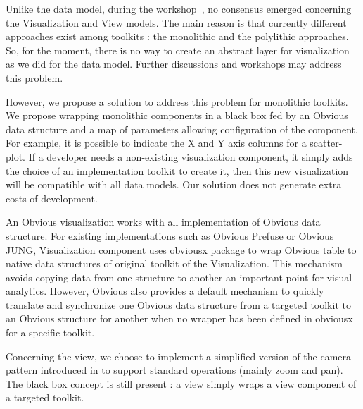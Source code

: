 Unlike the data model, during the workshop~\cite{vismaster2008}, no consensus emerged concerning the Visualization and View models. The main reason is that currently different approaches exist among toolkits : the monolithic and the polylithic approaches. So, for the moment, there is no way to create an abstract layer for visualization as we did for the data model. Further discussions and workshops may address this problem.

However, we propose a solution to address this problem for monolithic toolkits. We propose wrapping monolithic components in a black box fed by an Obvious data structure and a map of parameters allowing configuration of the component. For example, it is possible to indicate the X and Y axis columns for a scatter-plot. If a developer needs a non-existing visualization component, it simply adds the choice of an implementation toolkit to create it, then this new visualization will be compatible with all data models. Our solution does not generate extra costs of development.


An Obvious visualization works with all implementation of Obvious data structure. For existing implementations such as Obvious Prefuse or Obvious JUNG, Visualization component uses obviousx package to wrap Obvious table to native data structures of original toolkit of the Visualization. This mechanism avoids copying data from one structure to another an important point for visual analytics. However, Obvious also provides a default mechanism to quickly translate and synchronize one Obvious data structure from a targeted toolkit to an Obvious structure for another when no wrapper has been defined in obviousx for a specific toolkit.

Concerning the view, we choose to implement a simplified version of the camera pattern introduced in \cite{DesignPatternsIV} to support standard operations (mainly zoom and pan). The black box concept is still present : a view simply wraps a view component of a targeted toolkit.

